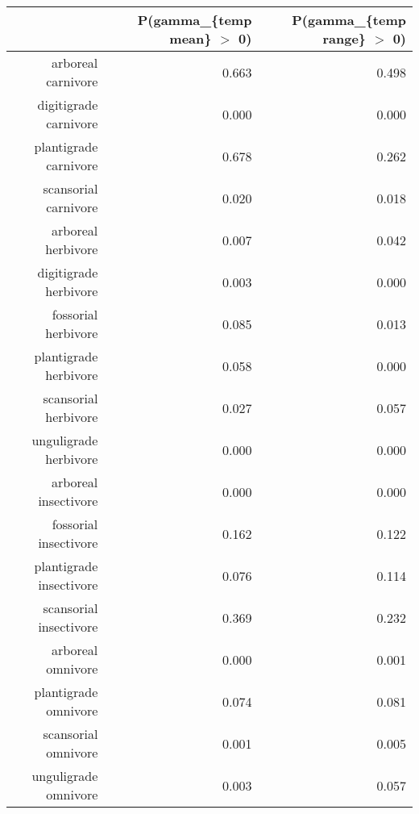 \begin{table}[ht]
\centering
\begin{tabular}{rrr}
  \hline
 & P(gamma\_\{temp mean\} $>$ 0) & P(gamma\_\{temp range\} $>$ 0) \\ 
  \hline
arboreal carnivore & 0.663 & 0.498 \\ 
  digitigrade carnivore & 0.000 & 0.000 \\ 
  plantigrade carnivore & 0.678 & 0.262 \\ 
  scansorial carnivore & 0.020 & 0.018 \\ 
  arboreal herbivore & 0.007 & 0.042 \\ 
  digitigrade herbivore & 0.003 & 0.000 \\ 
  fossorial herbivore & 0.085 & 0.013 \\ 
  plantigrade herbivore & 0.058 & 0.000 \\ 
  scansorial herbivore & 0.027 & 0.057 \\ 
  unguligrade herbivore & 0.000 & 0.000 \\ 
  arboreal insectivore & 0.000 & 0.000 \\ 
  fossorial insectivore & 0.162 & 0.122 \\ 
  plantigrade insectivore & 0.076 & 0.114 \\ 
  scansorial insectivore & 0.369 & 0.232 \\ 
  arboreal omnivore & 0.000 & 0.001 \\ 
  plantigrade omnivore & 0.074 & 0.081 \\ 
  scansorial omnivore & 0.001 & 0.005 \\ 
  unguligrade omnivore & 0.003 & 0.057 \\ 
   \hline
\end{tabular}
\label{tab:origin_temp}
\end{table}
